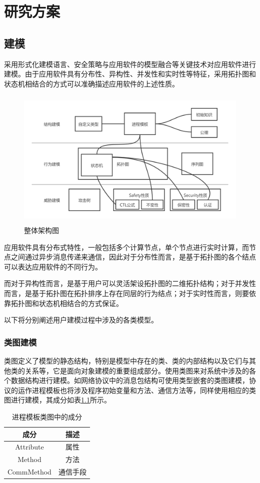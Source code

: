\chapter{研究方案}

\section{建模}
采用形式化建模语言、安全策略与应用软件的模型融合等关键技术对应用软件进行建模。由于应用软件具有分布性、异构性、并发性和实时性等特征，采用拓扑图和状态机相结合的方式可以准确描述应用软件的上述性质。
\par
\begin{figure}[h]
	\centering
	\includegraphics[width=12cm,height=6.75cm]{imgs/architecture.png}
	\caption{整体架构图}
	\label{architecture}
\end{figure}
\par
应用软件具有分布式特性，一般包括多个计算节点，单个节点进行实时计算，而节点之间通过异步消息传递来通信，因此对于分布性而言，是基于拓扑图的各个结点可以表达应用软件的不同行为。
\par
而对于异构性而言，是基于用户可以灵活架设拓扑图的二维拓扑结构；对于并发性而言，是基于拓扑图在拓扑排序上存在同层的行为结点；对于实时性而言，则要依靠拓扑图和状态机相结合的方式保证。
\par
以下将分别阐述用户建模过程中涉及的各类模型。

\subsection{类图建模}
类图定义了模型的静态结构，特别是模型中存在的类、类的内部结构以及它们与其他类的关系等，它是面向对象建模的重要组成部分。使用类图来对系统中涉及的各个数据结构进行建模。如网络协议中的消息包结构可使用类型嵌套的类图建模，协议的运作进程模板也将涉及程序初始变量和方法、通信方法等，同样使用相应的类图进行建模，其成分如表\ref{process}所示。
\begin{table}[h]
	\centering
	\begin{tabular}{|c|c|}
		\hline
		\textbf{成分} & \textbf{描述} \\ \hline
		Attribute           & 属性          \\ \hline
		Method              & 方法          \\ \hline
		CommMethod          & 通信手段        \\ \hline
	\end{tabular}
	\caption{进程模板类图中的成分}
	\label{process}
\end{table}

